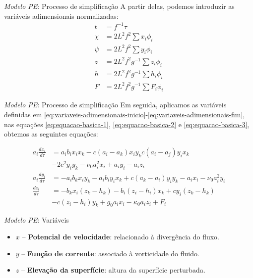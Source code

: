 
\begin{frame}{\textit{Modelo PE}: Processo de simplificação}
    A partir delas, podemos introduzir as variáveis adimensionais normalizadas:
    \begin{align}
        t &= f^{-1}\tau \label{eq:variaveis-adimensionais-inicio}\\
        \chi &= 2L^2f^2 \sum x_i\phi_i \\
        \psi &= 2L^2f^2 \sum y_i\phi_i \\
        z &= 2L^2f^2g^{-1} \sum z_i\phi_i \\
        h &= 2L^2f^2g^{-1} \sum h_i\phi_i \\
        F &= 2L^2f^2g^{-1} \sum F_i\phi_i \label{eq:variaveis-adimensionais-fim}
    \end{align}
\end{frame}



\begin{frame}{\textit{Modelo PE}: Processo de simplificação}
    Em seguida, aplicamos as variáveis definidas em \eqref{eq:variaveis-adimensionais-inicio}-\eqref{eq:variaveis-adimensionais-fim}, nas equações \eqref{eq:equacao-basica-1}, \eqref{eq:equacao-basica-2} e \eqref{eq:equacao-basica-3}, obtemos as seguintes equações:

    \begin{small}
        \begin{align}
       a_i\frac{dx_i}{d\tau} &= a_ib_ix_ix_k - c(a_i - a_k)x_iy_k  c(a_i - a_j)y_ix_k\nonumber\\
       &-2c^2y_iy_k - \nu_0a_i^2x_i + a_iy_i - a_iz_i \label{eq:equacao-principal-1}\\
       a_i\frac{dy_i}{d\tau} &= -a_ib_kx_iy_k - a_ib_iy_ix_k + c(a_k - a_i)y_iy_k - a_ix_i - \nu_0a_i^2y_i \label{eq:equacao-principal-2}\\
       \frac{dz_i}{d\tau} &= -b_kx_i(z_k - h_k) - b_i(z_i - h_i)x_k + cy_i(z_k - h_k) \nonumber\\
       &- c(z_i - h_i)y_k + g_0a_ix_i - \kappa_0a_iz_i + F_i \label{eq:equacao-principal-3}
    \end{align}
    \end{small}
\end{frame}


\begin{frame}{\textit{Modelo PE}: Variáveis}

\begin{itemize}
    \item $x$ – \textbf{Potencial de velocidade}: relacionado à divergência do fluxo.
    \item $y$ – \textbf{Função de corrente}: associado à vorticidade do fluido.
    \item $z$ – \textbf{Elevação da superfície}: altura da superfície perturbada.
\end{itemize}

\end{frame}

